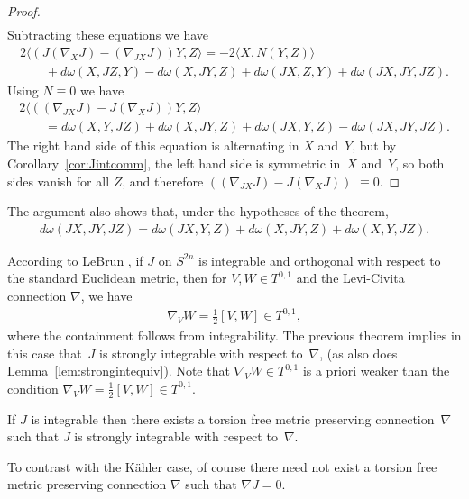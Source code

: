 \begin{proof}
\begin{gather*}
\end{gather*}
Subtracting these equations we have
\begin{gather*}
2\langle ( J ( \nabla_X J ) -( \nabla_{JX} J ) ) Y , Z \rangle= -2 \langle X, N(Y,Z) \rangle\\
\qquad{} + d \omega (X,JZ,Y) - d \omega (X,JY,Z) + d \omega (JX,Z,Y) + d \omega (JX,JY,JZ).
\end{gather*}
Using $N \equiv 0$ we have
\begin{gather*}
2\langle ( ( \nabla_{JX} J ) - J ( \nabla_X J ) ) Y , Z \rangle\\
\qquad{} = d \omega (X,Y, JZ) + d \omega (X,JY,Z) + d \omega (JX,Y,Z) - d \omega (JX,JY,JZ).
\end{gather*}
The right hand side of this equation is alternating in $X$ and~$Y$, but by Corollary~\ref{cor:Jintcomm}, the left hand side is symmetric in~$X$ and~$Y$, so both sides vanish for all $Z$, and therefore $ ( ( \nabla_{JX} J ) - J ( \nabla_X J ) )$ $\equiv 0$.
\end{proof}

The argument also shows that, under the hypotheses of the theorem,
\begin{gather*}
d \omega (JX,JY,JZ) = d \omega (JX,Y,Z) + d \omega (X,JY,Z) + d \omega (X,Y, JZ).
\end{gather*}

\begin{rmk} \label{rmk;orthversusstrong}
According to LeBrun \cite{L}, if $J$ on $S^{2n}$ is integrable and orthogonal with respect to the standard Euclidean metric, then for $V,W \in T^{0,1}$ and the Levi-Civita connection $\nabla$, we have
\begin{gather*}
\nabla_V W = \frac 1 2 [V,W] \in T^{0,1},
\end{gather*}
where the containment follows from integrability. The previous theorem implies in this case that~$J$ is strongly integrable with respect to~$\nabla$, (as also does Lemma~\ref{lem:strongintequiv}). Note that $\nabla_V W \in T^{0,1}$ is a priori weaker than the condition $\nabla_V W = \frac 1 2 [V,W] \in T^{0,1}$.
 \end{rmk}

\begin{cor}If $J$ is integrable then there exists a torsion free metric preserving connection~$\nabla$ such that $J$ is strongly integrable with respect to~$\nabla$.
\end{cor}

To contrast with the K\"ahler case, of course there need not exist a torsion free metric preserving connection $\nabla$ such that $\nabla J = 0$.

